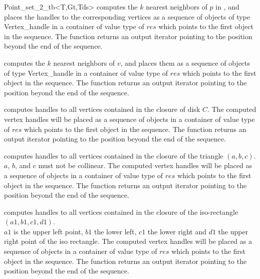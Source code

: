 \begin{ccRefClass}{Point_set_2_tb<T,Gt,Tds>}
{ computes the $k$ nearest neighbors of $p$ in \ccVar, and places the
handles to the corresponding vertices as a sequence of objects of type
Vertex\_handle in a container of value type of $res$
which points to the first object in the sequence. The function
returns an output iterator pointing to the position beyond the end
of the sequence. }

{ computes the $k$ nearest neighbors of $v$, and places them as a sequence of objects of type
Vertex\_handle in a container of value type of $res$
which points to the first object in the sequence. The function
returns an output iterator pointing to the position beyond the end
of the sequence. }

{ computes handles to all vertices contained in the closure of disk $C$.
The computed vertex handles will be placed as a sequence of objects in a container of value type
of $res$
which points to the first object in the sequence. The function
returns an output iterator pointing to the position beyond the end
of the sequence.
}

{ computes handles to all vertices contained in the closure of the triangle $(a,b,c)$.\\
\ccPrecond $a$, $b$, and $c$ must not be collinear. 
The computed vertex handles will be placed as a sequence of objects in a container of value type
of $res$
which points to the first object in the sequence. The function
returns an output iterator pointing to the position beyond the end
of the sequence.
}

{ computes handles to all vertices contained in the closure of the iso-rectangle $(a1,b1,c1,d1)$.\\
\ccPrecond $a1$ is the upper left point, $b1$ the lower left, $c1$ the lower
right and $d1$ the upper right point of the iso rectangle.
The computed vertex handles will be placed as a sequence of objects in a container of value type
of $res$
which points to the first object in the sequence. The function
returns an output iterator pointing to the position beyond the end
of the sequence.
}


\end{ccRefClass}
